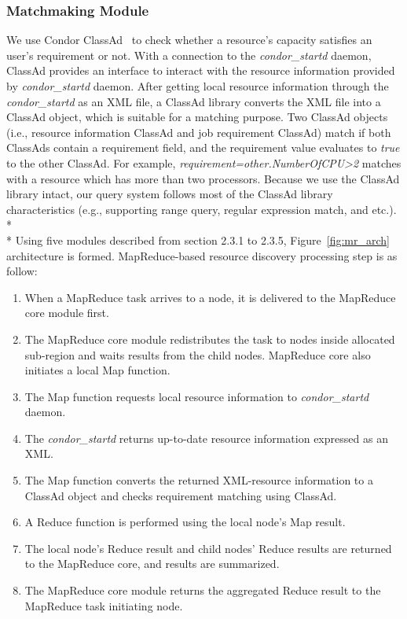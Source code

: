 \documentclass{acm_proc_article-sp}
\begin{document}
\subsubsection{Matchmaking Module}
We use Condor ClassAd~\cite{classad} to check whether a resource's capacity satisfies an user's requirement or not. 
With a connection to the \textit{condor\_startd} daemon, ClassAd provides an interface to interact with the resource information provided by \textit{condor\_startd} daemon. 
After getting local resource information through the \textit{condor\_startd} as an XML file, a ClassAd library converts the XML file into a ClassAd object, which is suitable for a matching purpose.
Two ClassAd objects (i.e., resource information ClassAd and job requirement ClassAd) match if both ClassAds contain a requirement field, and the requirement value evaluates to \textit{true} to the other ClassAd. 
For example, \textit{requirement=other.NumberOfCPU>2} matches with a resource which has more than two processors.
Because we use the ClassAd library intact, our query system follows most of the ClassAd library characteristics (e.g., supporting range query, regular expression match, and etc.).\\*\\*
Using five modules described from section 2.3.1 to 2.3.5, Figure~\ref{fig:mr_arch} architecture is formed. MapReduce-based resource discovery processing step is as follow:
\begin{enumerate}
\setlength{\itemsep}{0pt}
\setlength{\parskip}{0pt}
\item When a MapReduce task arrives to a node, it is delivered to the MapReduce core module first.
\item The MapReduce core module redistributes the task to nodes inside allocated sub-region and waits results from the child nodes. MapReduce core also initiates a local Map function.
\item The Map function requests local resource information to \textit{condor\_startd} daemon.
\item The \textit{condor\_startd} returns up-to-date resource information expressed as an XML.
\item The Map function converts the returned XML-resource information to a ClassAd object and checks requirement matching using ClassAd.
\item A Reduce function is performed using the local node's Map result.
\item The local node's Reduce result and child nodes' Reduce results are returned to the MapReduce core, and results are summarized.
\item The MapReduce core module returns the aggregated Reduce result to the MapReduce task initiating node.
\end{enumerate}
\end{document}
